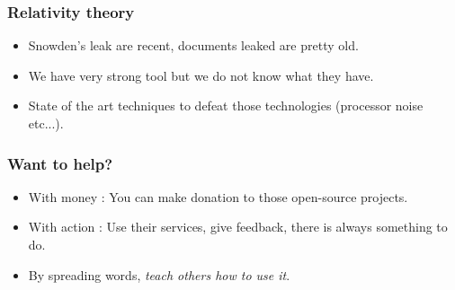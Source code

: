 \begin{frame}
\frametitle{Relativity theory}
\begin{itemize}
\item Snowden's leak are recent, documents leaked are pretty old.
\item We have very strong tool but we do not know what they have.
\item State of the art techniques to defeat those technologies
(processor noise etc...).
\end{itemize}
\end{frame}

\begin{frame}
\frametitle{Want to help?}
\begin{itemize}
\item With money : You can make donation to those open-source projects.
\item With action : Use their services, give feedback, there is always something
to do.
\item By spreading words, \emph{teach others how to use it}.
\end{itemize}
\end{frame}

